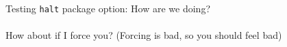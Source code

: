 \documentclass{article}
\begin{document}
Testing \texttt{halt} package option: How are we doing?\\
\\
How about if I force you? (Forcing is bad, so you should feel bad)\\
\end{document}
